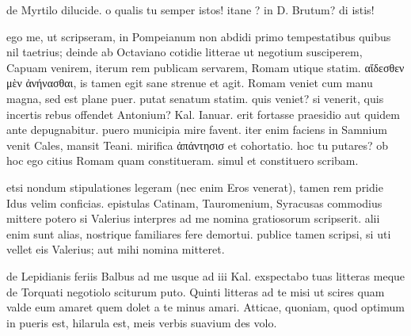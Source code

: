  de Myrtilo dilucide. o qualis tu semper istos! itane ? in D. Brutum? di istis!

 ego me, ut scripseram, in Pompeianum non abdidi primo tempestatibus quibus nil taetrius; deinde ab Octaviano cotidie litterae ut negotium susciperem, Capuam venirem, iterum rem publicam servarem, Romam utique statim. αἴδεσθεν μὲν ἀνήνασθαι, is tamen egit sane strenue et agit. Romam veniet cum manu magna, sed est plane puer. putat senatum statim. quis veniet? si venerit, quis incertis rebus offendet Antonium? Kal. Ianuar. erit fortasse praesidio aut quidem ante depugnabitur. puero municipia mire favent. iter enim faciens in Samnium venit Cales, mansit Teani. mirifica ἀπάντησισ et cohortatio. hoc tu putares? ob hoc ego citius Romam quam constitueram. simul et constituero scribam.

 etsi nondum stipulationes legeram (nec enim Eros venerat), tamen rem pridie Idus velim conficias. epistulas Catinam, Tauromenium, Syracusas commodius mittere potero si Valerius interpres ad me nomina gratiosorum scripserit. alii enim sunt alias, nostrique familiares fere demortui. publice tamen scripsi, si uti vellet eis Valerius; aut mihi nomina mitteret.

 de Lepidianis feriis Balbus ad me usque ad iii Kal. exspectabo tuas litteras meque de Torquati negotiolo sciturum puto. Quinti litteras ad te misi ut scires quam valde eum amaret quem dolet a te minus amari. Atticae, quoniam, quod optimum in pueris est, hilarula est, meis verbis suavium des volo.
